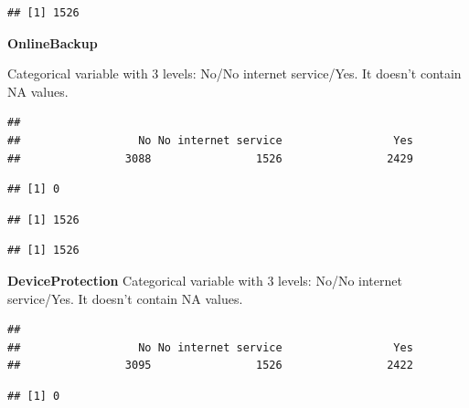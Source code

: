 \documentclass[
  twoside]{article}
\newenvironment{Shaded}{\begin{snugshade}}{\end{snugshade}}
\newcommand{\CommentTok}[1]{\textcolor[rgb]{0.56,0.35,0.01}{\textit{#1}}}
\newcommand{\FunctionTok}[1]{\textcolor[rgb]{0.00,0.00,0.00}{#1}}
\newcommand{\NormalTok}[1]{#1}
\newcommand{\SpecialCharTok}[1]{\textcolor[rgb]{0.00,0.00,0.00}{#1}}
\newcommand{\StringTok}[1]{\textcolor[rgb]{0.31,0.60,0.02}{#1}}
\begin{document}
\begin{verbatim}
## [1] 1526
\end{verbatim}

\textbf{OnlineBackup}

Categorical variable with 3 levels: No/No internet service/Yes. It
doesn't contain NA values.

\begin{verbatim}
## 
##                  No No internet service                 Yes 
##                3088                1526                2429
\end{verbatim}

\begin{verbatim}
## [1] 0
\end{verbatim}

\begin{Shaded}
\end{Shaded}

\begin{verbatim}
## [1] 1526
\end{verbatim}

\begin{Shaded}
\end{Shaded}

\begin{verbatim}
## [1] 1526
\end{verbatim}

\textbf{DeviceProtection} Categorical variable with 3 levels: No/No
internet service/Yes. It doesn't contain NA values.

\begin{verbatim}
## 
##                  No No internet service                 Yes 
##                3095                1526                2422
\end{verbatim}

\begin{verbatim}
## [1] 0
\end{verbatim}
\end{document}
